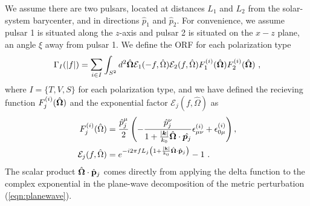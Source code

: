 \documentclass[prd,twocolumn,aps,psfig,nofootinbib,nobibnotes,superscriptaddress,preprintnumbers,times]{revtex4-2}
\begin{document}
We assume there are two pulsars, located at distances $L_1$ and $L_2$ from the solar-system barycenter, and in directions $\hat{p}_1$ and $\hat{p}_2$. For convenience, we assume pulsar 1 is situated along the $z$-axis and pulsar 2 is situated on the $x-z$ plane, an angle $\xi$ away from pulsar 1. We define the ORF for each polarization type
\begin{equation}\label{eq:orf_type}
    \Gamma_I(|f|) = \mathlarger{\sum}_{i \in I} \int_{S^2} d^2 \hat{\bf{\Omega}} \mathcal{E}_1(-f, \hat{\Omega}) \mathcal{E}_2(f, \hat{\Omega}) F_1^{(i)}(\hat{\bf{\Omega}}) F_2^{(i)}(\hat{\bf{\Omega}}) \ ,
\end{equation}
where $I = \{T,V,S\}$ for each polarization type, and we have defined the recieving function $F^{(i)}_j(\hat{\bf \Omega})$ and the exponential factor $\mathcal{E}_j(f, \hat{\Omega})$ as 
\begin{equation}\label{eqn:recieving}
    \begin{aligned}
        F^{(i)}_j(\hat{\Omega}) &= \frac{\hat{p}^\mu_j}{2}\left(-\frac{\hat{p}^\nu_j}{1+\frac{|\boldsymbol{k}|}{k_0} \hat{\boldsymbol{\Omega}} \cdot \hat{\boldsymbol{p}_j}} \epsilon_{\mu \nu}^{(i)}+\epsilon_{0 \mu}^{(i)}\right) , \\ 
        \mathcal{E}_j(f, \hat{\Omega}) &= e^{-i2\pi f L_j\left( 1 + \frac{|{\bf k}|}{k_0} \hat{\bf \Omega}\cdot \hat{\bf p}_j\right)} - 1 \ . 
    \end{aligned}
\end{equation}
The scalar product $\hat{\bf \Omega}\cdot \hat{\bf p}_j$ comes directly from applying the delta function to the complex exponential in the plane-wave decomposition of the metric perturbation (\ref{eqn:planewave}). 
\end{document}
